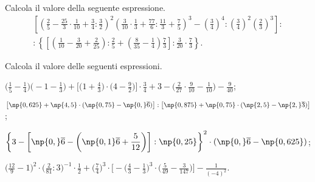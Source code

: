 \begin{esercizio}[\Ast]%
Calcola il valore della seguente espressione.
\begin{multline*}
\left[\left(\frac{2}{5}-\frac{25}{3}\cdot\frac{1}{10}+\frac{3}{4}:\frac{3}{2}\right)^2 \left(\frac{3}{10}\cdot\frac{1}{3}+\frac{77}{6}:\frac{11}{3}+\frac{7}{5}\right)^3-\left(\frac{3}{4}\right)^4:\left(\frac{3}{4}\right)^2\left(\frac{2}{3}\right)^3\right]:\\
:\left\lbrace\left[\left(\frac{1}{10}-\frac{3}{20}+\frac{2}{25}\right):\frac{2}{5}+\left(\frac{8}{35}-\frac{1}{4}\right)\frac{7}{3}\right]:\frac{3}{20}\cdot\frac{7}{3}\right\rbrace.
\end{multline*}
\end{esercizio}

\begin{esercizio}[\Ast]%
 Calcola il valore delle seguenti espressioni.
\begin{enumeratea}
\spazielenx
\item $\displaystyle{\bigg(\frac{1}{5}-\frac{1}{4}\bigg)\bigg(-1-\frac{1}{3}\bigg)+\bigg[\bigg(1+\frac{4}{3}\bigg)\cdot
\bigg(4-\frac{9}{2}\bigg)\bigg]\cdot{\frac{3}{4}}+3-\bigg(\frac{2}{27}\cdot{\frac{9}{10}}-\frac{1}{10}\bigg)-\frac{9}{40}}$;
\item $\displaystyle{\left[\np{0,625}+\np{4,5}\cdot(\np{0,75}-\np{0,}\overline{6})\right]:\left[\np{0,875}+\np{0,75}\cdot(\np{2,5}-\np{2,}\overline{3})\right]}$;
\item $\displaystyle{\bigg\{3-\bigg[\np{0,}\overline{6}-\bigg(\np{0,1}\overline{6}+\frac{5}{12}\bigg)\bigg]:\np{0,25}\bigg\}^{2}\cdot
(\np{0,}\overline{6}-\np{0,625})}$;
\item $\displaystyle{\bigg(\frac{12}{9}-1\bigg)^{2}\cdot\bigg(\frac{2}{81}:3\bigg)^{-1}\cdot\frac{1}{2}+\bigg(\frac{7}{4}\bigg)^{3}\cdot
\bigg[-\bigg(\frac{4}{3}-\frac{1}{3}\bigg)^{3}\cdot\bigg(\frac{5}{49}-\frac{3}{147}\bigg)\bigg]-\frac{1}{(-4)^{2}}}$.
\end{enumeratea}
\end{esercizio}

